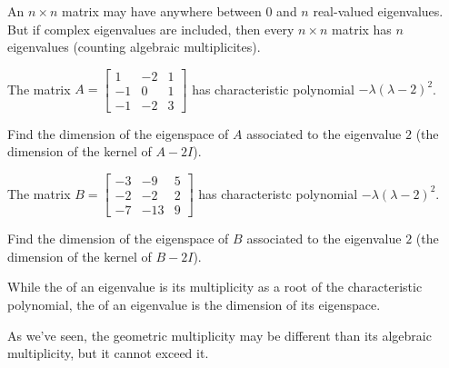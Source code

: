 \begin{applicationActivities}{4}{28}
\begin{observation}
  An \(n\times n\) matrix may have anywhere between \(0\) and \(n\)
  real-valued eigenvalues. But if complex eigenvalues are included,
  then every \(n\times n\) matrix has \(n\) eigenvalues (counting
  algebraic multiplicites).
\end{observation}

\begin{activity}{5}
  The matrix
  $A=\begin{bmatrix} 1 & -2 & 1 \\ -1 & 0 & 1 \\ -1 & -2 & 3\end{bmatrix}$
  has characteristic polynomial \(-\lambda(\lambda-2)^2\).

  Find the dimension of the eigenspace of $A$ associated to the
  eigenvalue $2$ (the dimension of the kernel of \(A-2I\)).
\end{activity}

\begin{activity}{5}
  The matrix
  $B=\begin{bmatrix} -3 & -9 & 5 \\ -2 & -2 & 2 \\ -7 & -13 & 9 \end{bmatrix}$
  has characteristc polynomial \(-\lambda(\lambda-2)^2\).

  Find the dimension of the eigenspace of $B$ associated to the
  eigenvalue $2$ (the dimension of the kernel of \(B-2I\)).
\end{activity}

\begin{definition}
While the  of an eigenvalue is its multiplicity as
a root of the characteristic polynomial,
the  of an eigenvalue is the dimension of its
eigenspace.
\end{definition}

\begin{fact}
  As we've seen, the geometric multiplicity may be different than
  its algebraic multiplicity, but it cannot exceed it.
\end{fact}


\end{applicationActivities}
